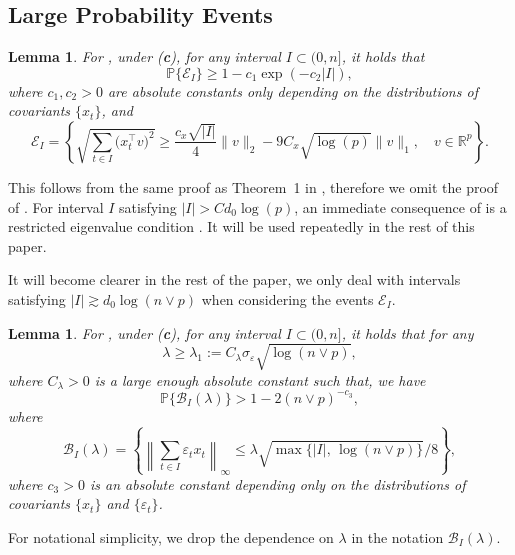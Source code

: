 \documentclass[twoside]{article}
\newtheorem{lemma}[theorem]{Lemma}
\begin{document}
\subsection{Large Probability Events}

\begin{lemma}\label{lem-RE}
For , under (\textbf{c}), for any interval $I \subset (0, n]$, it holds that
	\[
		\mathbb{P}\{\mathcal{E}_I\} \geq 1 - c_1 \exp(-c_2 |I|),
	\]
	where $c_1, c_2 > 0$ are absolute constants only depending on the distributions of covariants $\{x_t\}$, and
	\[
		\mathcal{E}_I = \left\{\sqrt{\sum_{t \in I} \bigl(x_t^{\top}v\bigr)^2} \geq \frac{c_x\sqrt{ |I|}}{4} \|v\|_2 - 9 C_x \sqrt{\log(p)}\|v\|_1, \quad v \in \mathbb{R}^p \right\}.
	\]
\end{lemma}

This follows from the same proof as Theorem~1 in \cite{raskutti2010restricted}, therefore we omit the proof of .  For interval $I$ satisfying $|I| > C d_0\log(p)$, an immediate consequence of  is a restricted eigenvalue condition \citep[e.g.][]{van2009conditions, bickel2009simultaneous}.  It will be used repeatedly in the rest of this paper.

It will become clearer in the rest of the paper, we only deal with intervals satisfying $|I| \gtrsim d_0\log(n \vee p)$ when considering the events $\mathcal{E}_I$.

\begin{lemma}\label{lem-x-bound}
For , under (\textbf{c}), for any interval $I \subset (0, n]$, it holds that for any 
	\[
		\lambda \geq \lambda_1 := C_{\lambda}\sigma_{\varepsilon} \sqrt{\log(n \vee p)},
	\]
	where $C_{\lambda} > 0$ is a large enough absolute constant such that, we have
	\[
		\mathbb{P}\{\mathcal{B}_I(\lambda)\} > 1 - 2(n \vee p)^{-c_3},
	\]	
	where
	\[
		\mathcal{B}_I(\lambda) = \left\{\left\|\sum_{t \in I} \varepsilon_t x_t \right\|_{\infty} \leq \lambda \sqrt{\max\{|I|, \, \log(n \vee p)\}}/8 \right\},
	\]
	where $c_3 > 0$ is an absolute constant depending only on the distributions of covariants $\{x_t\}$ and $\{\varepsilon_t\}$.
\end{lemma}

For notational simplicity, we drop the dependence on $\lambda$ in the notation $\mathcal{B}_I(\lambda)$.
\end{document}
